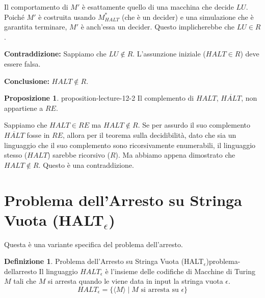 \documentclass[a4paper]{article}
\makeatletter
\theoremstyle{definition} %
\newtheorem{definition}{Definizione}[section] %
\newtheorem{proposition}{Proposizione}[section]
\renewenvironment{proof}[1][\proofname]{\par
  \pushQED{\qed}%
  \normalfont \topsep6\p@\@plus6\p@\relax
  \trivlist
  \item[\hskip\labelsep
        \bfseries
    #1\@addpunct{.}]\ignorespaces
}{%
  \popQED\endtrivlist\@endpefalse
}
\makeatother
\begin{document}
\begin{proof}
Il comportamento di $M'$ è esattamente quello di una macchina che decide $LU$. Poiché $M'$ è costruita usando $M_{HALT}^*$ (che è un decider) e una simulazione che è garantita terminare, $M'$ è anch'essa un decider. Questo implicherebbe che $LU \in R$.

\textbf{Contraddizione:} Sappiamo che $LU \notin R$.
L'assunzione iniziale ($HALT \in R$) deve essere falsa.

\textbf{Conclusione:} $HALT \notin R$.
\end{proof}

\begin{proposition}{}{{ proposition-lecture-12-2 }}
Il complemento di $HALT$, $\overline{HALT}$, non appartiene a $RE$.
\end{proposition}
\begin{proof}
Sappiamo che $HALT \in RE$ ma $HALT \notin R$. Se per assurdo il suo complemento $\overline{HALT}$ fosse in $RE$, allora per il teorema sulla decidibilità, dato che sia un linguaggio che il suo complemento sono ricorsivamente enumerabili, il linguaggio stesso ($HALT$) sarebbe ricorsivo ($R$). Ma abbiamo appena dimostrato che $HALT \notin R$. Questo è una contraddizione.
\end{proof}

\section{Problema dell'Arresto su Stringa Vuota (HALT$_\epsilon$)}
Questa è una variante specifica del problema dell'arresto.
\begin{definition}{Problema dell'Arresto su Stringa Vuota (HALT$_\epsilon$)}{problema-dellarresto}
Il linguaggio $HALT_\epsilon$ è l'insieme delle codifiche di Macchine di Turing $M$ tali che $M$ si arresta quando le viene data in input la stringa vuota $\epsilon$.
\[ HALT_\epsilon = \{ \langle M \rangle \mid M \text{ si arresta su } \epsilon \} \]
\end{definition}
\end{document}
